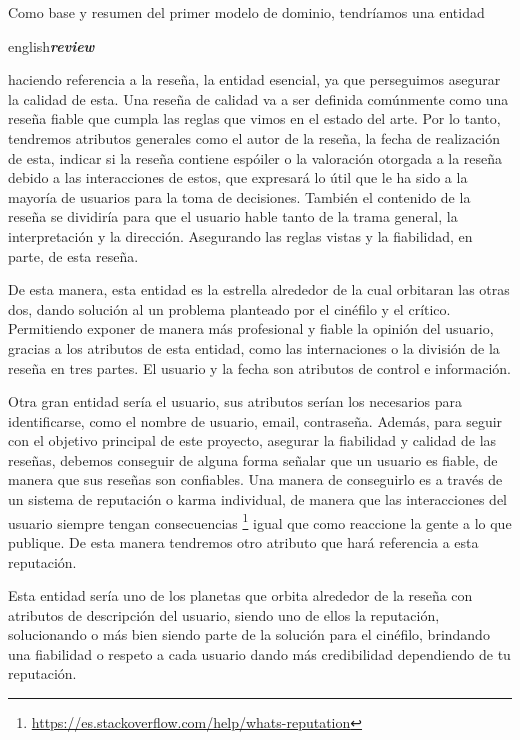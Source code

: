 Como base y resumen del primer modelo de dominio, tendríamos una entidad \begin{otherlanguage}
{english}\textit{\textbf{review}}\end{otherlanguage} haciendo referencia a la reseña, la entidad 
esencial, ya que perseguimos asegurar la calidad de esta. Una reseña de calidad va a ser definida 
comúnmente como una reseña fiable que cumpla las reglas que vimos en el estado del arte. Por lo tanto, 
tendremos atributos generales como el autor de la reseña, la fecha de realización de esta, indicar si 
la reseña contiene espóiler o la valoración otorgada a la reseña debido a las interacciones de estos, 
que expresará lo útil que le ha sido a la mayoría de usuarios para la toma de decisiones. También el 
contenido de la reseña se dividiría para que el usuario hable tanto de la trama general, la 
interpretación y la dirección. Asegurando las reglas vistas y la fiabilidad, en parte, de esta reseña.

De esta manera, esta entidad es la estrella alrededor de la cual orbitaran las otras dos, dando 
solución al un problema planteado por el cinéfilo y el crítico. Permitiendo exponer de manera más 
profesional y fiable la opinión del usuario, gracias a los atributos de esta entidad, como las 
internaciones o la división de la reseña en tres partes. El usuario y la fecha son atributos de control 
e información.

Otra gran entidad sería el usuario, sus atributos serían los necesarios para identificarse, como el 
nombre de usuario, email, contraseña. Además, para seguir con el objetivo principal de este proyecto, 
asegurar la fiabilidad y calidad de las reseñas, debemos conseguir de alguna forma señalar que un 
usuario es fiable, de manera que sus reseñas son confiables. Una manera de conseguirlo es a través de 
un sistema de reputación o karma individual, de manera que las interacciones del usuario siempre tengan 
consecuencias \footnote{\url{https://es.stackoverflow.com/help/whats-reputation}} igual que como 
reaccione la gente a lo que publique. De esta manera tendremos otro atributo que hará referencia a esta 
reputación.

Esta entidad sería uno de los planetas que orbita alrededor de la reseña con atributos de descripción 
del usuario, siendo uno de ellos la reputación, solucionando o más bien siendo parte de la solución 
para el cinéfilo, brindando una fiabilidad o respeto a cada usuario dando más credibilidad dependiendo 
de tu reputación.

